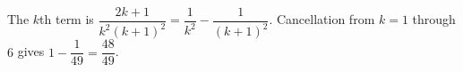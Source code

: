 The $k$th term is $\dfrac{2k+1}{k^2(k+1)^2}=\dfrac{1}{k^2}-\dfrac{1}{(k+1)^2}$. Cancellation from $k=1$ through $6$ gives $1-\dfrac{1}{49}=\boxed{\dfrac{48}{49}}$.
